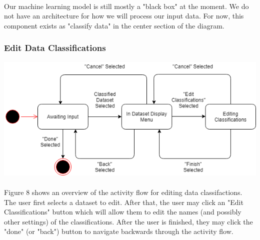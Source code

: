\documentclass[12pt,oneside,letterpaper]{article}
\begin{document}
\paragraph{}Our machine learning model is still mostly a "black box" at the moment. We do not have an architecture for how we will process our input data. For now, this component exists as "classify data" in the center section of the diagram.

 \subsubsection{Edit Data Classifications}
\includegraphics[scale = 0.70]{bread_state_diagram.png}
\begingroup
{}
\endgroup

\paragraph{}Figure 8 shows an overview of the activity flow for editing data classifactions. The user first selects a dataset to edit. After that, the user may click an "Edit Classifications" button which will allow them to edit the names (and possibly other settings) of the classifications. After the user is finished, they may click the "done" (or "back") button to navigate backwards through the activity flow.
\end{document}
